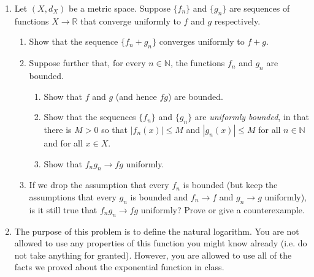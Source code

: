 \documentclass[12pt, letterpaper]{article}
\newcommand{\0}{\mathbf{0}}
\newcommand{\1}{\mathbf{1}}
\begin{document}
\begin{enumerate}
\begin{enumerate}
    \end{enumerate}

    \vspace{0.5cm}

    \item 
    Let $(X, d_X)$ be a metric space. Suppose $\{f_n\}$ and $\{g_n\}$ are sequences of functions $X \to \mathbb{R}$ that converge uniformly to $f$ and $g$ respectively.
    \begin{enumerate}
        \item 
        Show that the sequence $\{f_n + g_n\}$ converges uniformly to $f + g$.\\

        \item 
        Suppose further that, for every $n \in \mathbb{N}$, the functions $f_n$ and $g_n$ are bounded.\\
        \begin{enumerate}
            \item 
            Show that $f$ and $g$ (and hence $fg$) are bounded.\\
        
            \item 
            Show that the sequences $\{f_n\}$ and $\{g_n\}$ are \textit{uniformly bounded}, in that there is $M > 0$ so that $|f_n(x)| \leq M$ and $|g_n(x)| \leq M$ for all $n \in \mathbb{N}$ and for all $x \in X$.\\

            \item 
            Show that $f_ng_n \to fg$ uniformly.\\

        \end{enumerate}

        \item 
        If we drop the assumption that every $f_n$ is bounded (but keep the assumptions that every $g_n$ is bounded and $f_n \to f$ and $g_n \to g$ uniformly), is it still true that $f_ng_n \to fg$ uniformly? Prove or give a counterexample.
            
    \end{enumerate}

    \vspace{0.5cm}

    \item 
    The purpose of this problem is to define the natural logarithm. You are not allowed to use any properties of this function you might know already (i.e. do not take anything for granted). However, you are allowed to use all of the facts we proved about the exponential function in class.\\
    

\end{enumerate}
\end{document}

